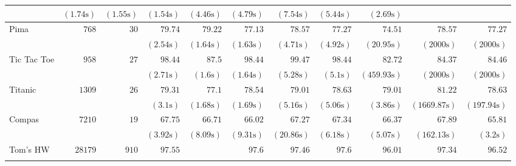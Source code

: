 \documentclass{article}
\begin{document}
\begin{table*}[h]
\begin{center}
\begin{tabular}{|l | r | r |r |r| r |r |r |r| r|r|}
				& $  ( 1.74 \text{s} ) $    & $  ( 1.55 \text{s} ) $    & $  ( 1.54 \text{s} ) $    & $  ( 4.46 \text{s} ) $    & $  ( 4.79 \text{s} ) $    & $  ( 7.54 \text{s} ) $    & $  ( 5.44 \text{s} ) $    & $  ( 2.69 \text{s} ) $   \\ \hline
				\multirow{2}{*}{ Pima}   & $  768 $  & $  30 $  & $   79.74  $    & $   79.22  $    & $   77.13  $    & $   78.57  $    & $   77.27  $    & $   74.51  $    & $   78.57  $    & $   77.27  $   \\ & & 
				& $  ( 2.54 \text{s} ) $    & $  ( 1.64 \text{s} ) $    & $  ( 1.63 \text{s} ) $    & $  ( 4.71 \text{s} ) $    & $  ( 4.92 \text{s} ) $    & $  ( 20.95 \text{s} ) $    & $  (  2000 \text{s}  ) $     & $  (  2000 \text{s}  ) $    \\ \hline
				\multirow{2}{*}{ Tic Tac Toe}   & $  958 $  & $  27 $  & $   98.44  $    & $   87.5  $    & $   98.44  $    & $   99.47  $    & $   98.44  $    & $   82.72  $    & $   84.37  $    & $   84.46  $   \\ & & 
				& $  ( 2.71 \text{s} ) $    & $  ( 1.6 \text{s} ) $    & $  ( 1.64 \text{s} ) $    & $  ( 5.28 \text{s} ) $    & $  ( 5.1 \text{s} ) $    & $  ( 459.93 \text{s} ) $    & $  (  2000 \text{s}  ) $     & $  (  2000 \text{s}  ) $    \\ \hline
				\multirow{2}{*}{ Titanic}   & $  1309 $  & $  26 $  & $   79.31  $    & $   77.1  $    & $   78.54  $    & $   79.01  $    & $   78.63  $    & $   79.01  $    & $   81.22  $    & $   78.63  $   \\ & & 
				& $  ( 3.1 \text{s} ) $    & $  ( 1.68 \text{s} ) $    & $  ( 1.69 \text{s} ) $    & $  ( 5.16 \text{s} ) $    & $  ( 5.06 \text{s} ) $    & $  ( 3.86 \text{s} ) $    & $  ( 1669.87 \text{s} ) $    & $  ( 197.94 \text{s} ) $   \\ \hline
				\multirow{2}{*}{ Compas}   & $  7210 $  & $  19 $  & $   67.75  $    & $   66.71  $    & $   66.02  $    & $   67.27  $    & $   67.34  $    & $   66.37  $    & $   67.89  $    & $   65.81  $   \\ & & 
				& $  ( 3.92 \text{s} ) $    & $  ( 8.09 \text{s} ) $    & $  ( 9.31 \text{s} ) $    & $  ( 20.86 \text{s} ) $    & $  ( 6.18 \text{s} ) $    & $  ( 5.07 \text{s} ) $    & $  ( 162.13 \text{s} ) $    & $  ( 3.2 \text{s} ) $   \\ \hline
				\multirow{2}{*}{ Tom's HW}   & $  28179 $  & $  910 $  & $   97.55  $    &         & $   97.6  $    & $   97.46  $    & $   97.6  $    & $   96.01  $    & $   97.34  $    & $   96.52  $   \\ & & 

\end{tabular}
\end{center}
\end{table*}
\end{document}
